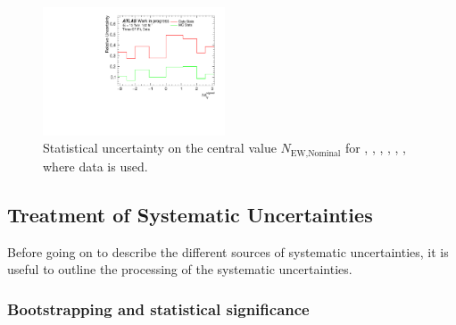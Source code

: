 \begin{figure}[t]
  \includegraphics[width=0.48\textwidth]{plots/diffx/statunc/data/relative_datastats_lepgam_dphi_27Nov.pdf}
  \caption{Statistical uncertainty on the central value $N_{\text{EW,Nominal}}$ for \mjj, \ptjj, \dphisigned, \mly, \leppt, \lepgamdphi, where data is used.}
  \label{fig:vbswy:statsdata}
\end{figure}

\subsection{Treatment of Systematic Uncertainties}

Before going on to describe the different sources of systematic uncertainties, it is useful to outline the processing of the systematic uncertainties.

\subsubsection{Bootstrapping and statistical significance}

